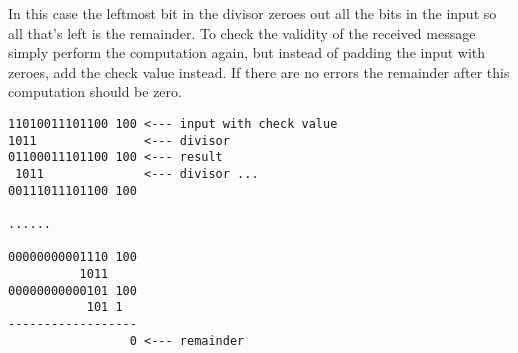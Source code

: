 \documentclass{article}
\begin{document}
In this case the leftmost bit in the divisor zeroes out all the bits in the input so all that's left is the remainder.
To check the validity of the received message simply perform the computation again, but instead of padding the input
with zeroes, add the check value instead. If there are no errors the remainder after this computation should be zero.
\begin{verbatim}
11010011101100 100 <--- input with check value
1011               <--- divisor
01100011101100 100 <--- result
 1011              <--- divisor ...
00111011101100 100

......
  
00000000001110 100
          1011
00000000000101 100 
           101 1
------------------
                 0 <--- remainder
\end{verbatim}
\end{document}
